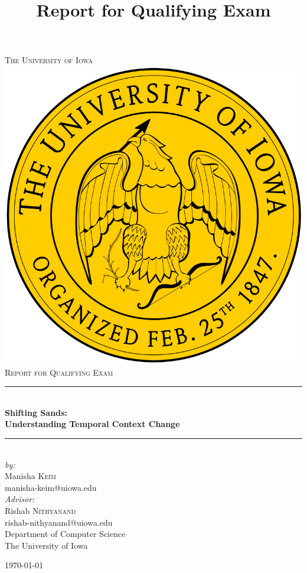 
\begin{titlepage}

\newcommand{\HRule}{\rule{\linewidth}{0.5mm}}
\center

\textsc{\LARGE The University of Iowa}\\[1.5cm]
\includegraphics[scale=.1]{figures/iowa}\\[1cm]
\textsc{\Large Report for Qualifying Exam}\\[0.5cm]
\title {Report for Qualifying Exam}
\HRule \\[0.4cm]
{ \huge \bfseries Shifting Sands: \\Understanding Temporal Context Change}\\[0.4cm]
\HRule \\[1.5cm]


\emph{by:} \\
Manisha \textsc{Keim} \\
manisha-keim@uiowa.edu \\[0.5cm]

\emph{Advisor:}\\
Rishab \textsc{Nithyanand}\\
rishab-nithyanand@uiowa.edu \\[0.5cm]

Department of Computer Science \\
The University of Iowa

{\today}\\[2cm]

\end{titlepage}